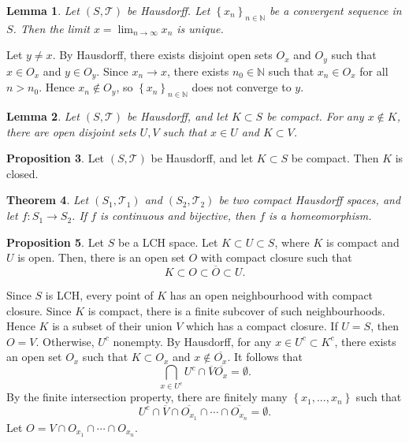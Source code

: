 \documentclass[11pt]{article}
\newtheorem{thm}{Theorem}[subsection]
\newtheorem{lemma}[thm]{Lemma}
\theoremstyle{definition}
\newtheorem{prop}[thm]{Proposition}
\newcommand{\set}[1]{\left\{ #1 \right\}}
\newcommand{\NN}{\mathbb{N}}
\newcommand{\m}[1]{\mathcal{#1}}
\begin{document}
\begin{lemma}
Let $(S,\m{T})$ be Hausdorff. Let $\set{x_n}_{n\in\NN}$ be a convergent sequence in $S$.
Then the limit $x=\lim_{n\to\infty}x_n$ is unique.
\end{lemma}
\proof
Let $y\neq x$. By Hausdorff, there exists disjoint open sets $O_x$ and $O_y$ such that
$x\in O_x$ and $y\in O_y$. Since $x_n\to x$, there exists $n_0\in\NN$ such that $x_n\in
O_x$ for all $n>n_0$. Hence $x_n\notin O_y$, so $\set{x_n}_{n\in\NN}$ does not converge to
$y$.
\qedhere

\begin{lemma}
Let $(S,\m{T})$ be Hausdorff, and let $K\subset S$ be compact. For any $x\notin K$, there
are open disjoint sets $U,V$ such that $x\in U$ and $K\subset V$.
\end{lemma}

\begin{prop}
Let $(S,\m{T})$ be Hausdorff, and let $K\subset S$ be compact. Then $K$ is closed.
\end{prop}

\begin{thm}
Let $(S_1,\m{T}_1)$ and $(S_2,\m{T}_2)$ be two compact Hausdorff spaces, and let $f:S_1\to
S_2$. If $f$ is continuous and bijective, then $f$ is a homeomorphism.
\end{thm}



\begin{prop}
Let $S$ be a LCH space. Let $K\subset U\subset S$, where $K$ is compact and $U$ is open.
Then, there is an open set $O$ with compact closure such that
\[
K\subset O\subset \overline{O}\subset U .
\]
\end{prop}
\proof
Since $S$ is LCH, every point of $K$ has an open neighbourhood with compact closure. Since
$K$ is compact, there is a finite subcover of such neighbourhoods. Hence $K$ is a subset of
their union $V$ which has a compact closure. If $U=S$, then $O=V$. Otherwise, $U^c$
nonempty. By Hausdorff, for any $x\in U^c\subset K^c$, there exists an open set $O_x$ such
that $K\subset O_x$ and $x\notin \overline{O_x}$. It follows that
\[
\bigcap_{x\in U^c} U^c\cap\overline{V}\overline{O_x} = \emptyset .
\]
By the finite intersection property, there are finitely many $\set{x_1,...,x_n}$ such that
\[
U^c\cap\overline{V}\cap\overline{O_{x_1}}\cap\cdots\cap\overline{O_{x_n}} = \emptyset .
\]
Let $O=V\cap O_{x_1}\cap\cdots\cap O_{x_n}$.
\qedhere
\end{document}

